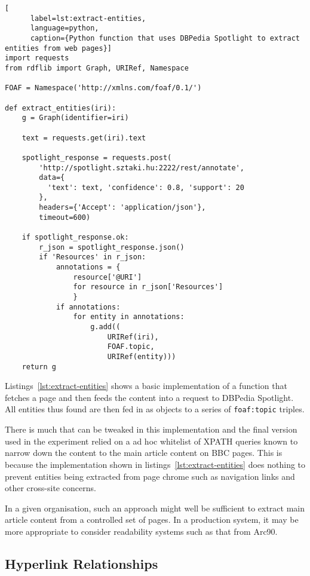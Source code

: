 \begin{centering}
  \begin{lstlisting}[
      label=lst:extract-entities,
      language=python,
      caption={Python function that uses DBPedia Spotlight to extract entities from web pages}]
import requests
from rdflib import Graph, URIRef, Namespace

FOAF = Namespace('http://xmlns.com/foaf/0.1/')
    
def extract_entities(iri):
    g = Graph(identifier=iri)

    text = requests.get(iri).text
    
    spotlight_response = requests.post(
        'http://spotlight.sztaki.hu:2222/rest/annotate',
        data={
          'text': text, 'confidence': 0.8, 'support': 20
        },
        headers={'Accept': 'application/json'},
        timeout=600)

    if spotlight_response.ok:
        r_json = spotlight_response.json()
        if 'Resources' in r_json:
            annotations = {
                resource['@URI']
                for resource in r_json['Resources']
                }
            if annotations:
                for entity in annotations:
                    g.add((
                        URIRef(iri),
                        FOAF.topic,
                        URIRef(entity)))
    return g
  \end{lstlisting}
\end{centering}

Listings~\ref{lst:extract-entities} shows a basic implementation of
a function that fetches a page and then feeds the content into a
request to DBPedia Spotlight. All entities thus found are then fed
in as objects to a series of \texttt{foaf:topic} triples.

There is much that can be tweaked in this implementation and the
final version used in the experiment relied on a ad hoc whitelist
of XPATH queries known to narrow down the content to the main article
content on BBC pages. This is because the implementation shown in
listings~\ref{lst:extract-entities} does nothing to prevent entities
being extracted from page
chrome such as navigation links and other cross-site concerns.

In a given organisation, such an approach might well be sufficient to
extract main article content from a controlled set of pages. In a
production system, it may be more appropriate to consider
readability systems such as that from Arc90.

\subsection{Hyperlink Relationships}

